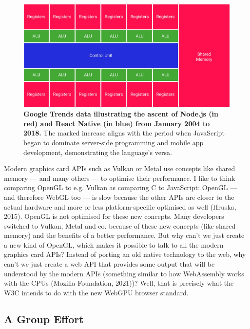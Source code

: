 \documentclass[10pt]{article}
\begin{document}
\begin{sloppypar}
  \begin{figure}[ht]
    \centering
    \includegraphics[width=\textwidth]{figures/shared-memory.png}
    \caption[Google Trends data illustrating the ascent of Node.js and React Native.]{\textbf{Google Trends data illustrating the ascent of Node.js (in red) and React Native (in blue) from January 2004 to 2018.} The marked increase aligns with the period when JavaScript began to dominate server-side programming and mobile app development, demonstrating the language's versa.}
    \label{fig:shared-memory}
  \end{figure}

  Modern graphics card APIs such as Vulkan or Metal use concepts like shared memory — and many others — to optimise their performance. I like to think comparing OpenGL to e.g. Vulkan as comparing C to JavaScript: OpenGL — and therefore WebGL too — is slow because the other APIs are closer to the actual hardware and more or less platform-specific optimised as well (Hruska, 2015). OpenGL is not optimised for these new concepts. Many developers switched to Vulkan, Metal and co. because of these new concepts (like shared memory) and the benefits of a better performance. But why can’t we just create a new kind of OpenGL, which makes it possible to talk to all the modern graphics card APIs? Instead of porting an old native technology to the web, why can’t we just create a web API that provides some output that will be understood by the modern APIs (something similar to how WebAssembly works with the CPUs (Mozilla Foundation, 2021))? Well, that is precisely what the W3C intends to do with the new WebGPU browser standard.

  \subsection{A Group Effort}
  \label{subsec:a-group-effort}


\end{sloppypar}
\end{document}

